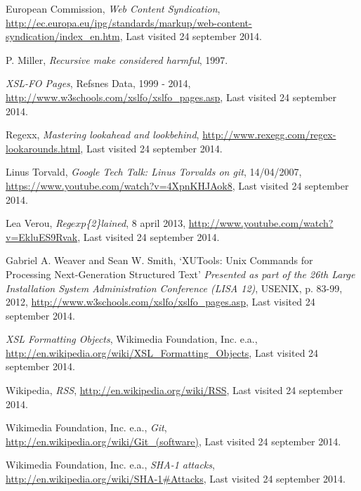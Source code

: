 \renewcommand{\bibname}{References}

\begin{thebibliography}{90}

  
    European Commission, 
    \emph{Web Content Syndication},
    \url{http://ec.europa.eu/ipg/standards/markup/web-content-syndication/index\_en.htm}, 
    Last visited 24 september 2014.

  P. Miller,
  \emph{Recursive make considered harmful},
  1997.

  \emph{XSL-FO Pages},
  Refsnes Data,
  1999 - 2014,
  \url{http://www.w3schools.com/xslfo/xslfo\_pages.asp},
  Last visited 24 september 2014.

    Regexx,
    \emph{Mastering lookahead and lookbehind},
	\url{http://www.rexegg.com/regex-lookarounds.html}, 
	Last visited 24 september 2014.

    Linus Torvald,
    \emph{Google Tech Talk: Linus Torvalds on git},
    14/04/2007,
	\url{https://www.youtube.com/watch?v=4XpnKHJAok8},
	Last visited 24 september 2014.

	Lea Verou,
	\emph{Reg\(exp\)\{2\}lained},
	8 april 2013,
	\url{http://www.youtube.com/watch?v=EkluES9Rvak},
	Last visited 24 september 2014.

  Gabriel A. Weaver and Sean W. Smith,
  `XUTools: Unix Commands for Processing Next-Generation Structured Text'
  \emph{Presented as part of the 26th Large Installation System Administration Conference (LISA 12)},
  USENIX,
  p. 83-99,
  2012,
  \url{http://www.w3schools.com/xslfo/xslfo\_pages.asp},
  Last visited 24 september 2014.

  \emph{XSL Formatting Objects},
  Wikimedia Foundation, Inc. e.a., 
  \url{http://en.wikipedia.org/wiki/XSL\_Formatting\_Objects},
  Last visited 24 september 2014.

    Wikipedia,
    \emph{RSS},
    \url{http://en.wikipedia.org/wiki/RSS}, 
    Last visited 24 september 2014.
	
    Wikimedia Foundation, Inc. e.a., 
    \emph{Git},
    \url{http://en.wikipedia.org/wiki/Git\_(software)}, 
    Last visited 24 september 2014.
    
    Wikimedia Foundation, Inc. e.a.,
    \emph{SHA-1 attacks},
    \url{http://en.wikipedia.org/wiki/SHA-1#Attacks},
    Last visited 24 september 2014.

\end{thebibliography}
